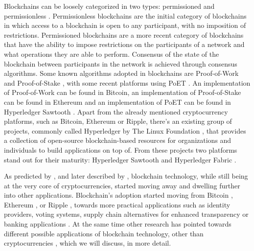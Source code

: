 Blockchains can be loosely categorized in two types: permissioned and permissionless \cite{pilkington_blockchain_2016, yaga_blockchain_2018}. Permissionless blockchains are the initial category of blockchains in which access to a blockchain is open to any participant, with no imposition of restrictions. Permissioned blockchains are a more recent category of blockchains that have the ability to impose restrictions on the participants of a network and what operations they are able to perform. Consensus of the state of the blockchain between participants in the network is achieved through consensus algorithms. Some known algorithms adopted in blockchains are Proof-of-Work \cite{nakamoto_bitcoin:_2008} and Proof-of-Stake \cite{king_ppcoin:_2012}, with some recent platforms using PoET \cite{intel_poet}. An implementation of Proof-of-Work can be found in Bitcoin, an implementation of Proof-of-Stake can be found in Ethereum and an implementation of PoET can be found in Hyperledger Sawtooth \cite{yaga_blockchain_2018}. Apart from the already mentioned cryptocurrency platforms, such as Bitcoin, Ethereum or Ripple, there's an existing group of projects, commonly called Hyperledger \cite{hyperledger} by The Linux Foundation \cite{linuxfoundation}, that provides a collection of open-source blockchain-based resources for organizations and individuals to build applications on top of. From these projects two platforms stand out for their maturity: Hyperledger Sawtooth \cite{hyperledger_sawtooth} and Hyperledger Fabric \cite{hyperledger_fabric}.

As predicted by \cite{buterin_next-generation_2013}, and later described by \cite{pilkington_blockchain_2016}, blockchain technology, while still being at the very core of cryptocurrencies, started moving away and dwelling further into other applications. Blockchain's adoption started moving from Bitcoin \cite{nakamoto_bitcoin:_2008}, Ethereum \cite{buterin_next-generation_2013}, or Ripple \cite{schwartz_ripple_2014}, towards more practical applications such as identity providers, voting systems, supply chain alternatives for enhanced transparency or banking applications \cite{pilkington_blockchain_2016}. At the same time other research has pointed towards different possible applications of blockchain technology, other than cryptocurrencies \cite{crosby_blockchain_2016, underwood_blockchain_2016, yermack_corporate_2017, xu_blockchain_2016}, which we will discuss, in more detail.


